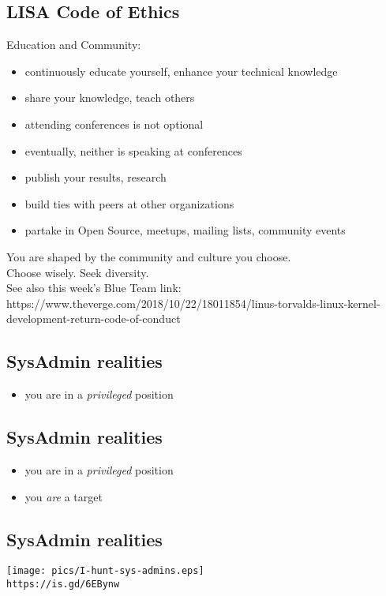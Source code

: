 \documentclass[xga]{xdvislides}
\begin{document}
\subsection{LISA Code of Ethics}
Education and Community:
\begin{itemize}
	\item continuously educate yourself, enhance your technical knowledge
	\item share your knowledge, teach others
	\item attending conferences is not optional
	\item eventually, neither is speaking at conferences
	\item publish your results, research
	\item build ties with peers at other organizations
	\item partake in Open Source, meetups, mailing lists, community events
\end{itemize}
\vspace{.25in}
You are shaped by the community and culture you choose. \\
Choose wisely.  Seek diversity. \\

See also this week's Blue Team link:  \\
https://www.theverge.com/2018/10/22/18011854/linus-torvalds-linux-kernel-development-return-code-of-conduct

\subsection{SysAdmin realities}
\begin{itemize}
	\item you are in a {\em privileged} position
\end{itemize}

\subsection{SysAdmin realities}
\begin{itemize}
	\item you are in a {\em privileged} position
	\item you {\em are} a target
\end{itemize}

\subsection{SysAdmin realities}
\begin{center}
	\texttt{[image: pics/I-hunt-sys-admins.eps]} \\
	\small
	{\tt https://is.gd/6EBynw}\hspace{.5in}{\tt https://is.gd/u8ni1B}
	\Normalsize
\end{center}
\end{document}
